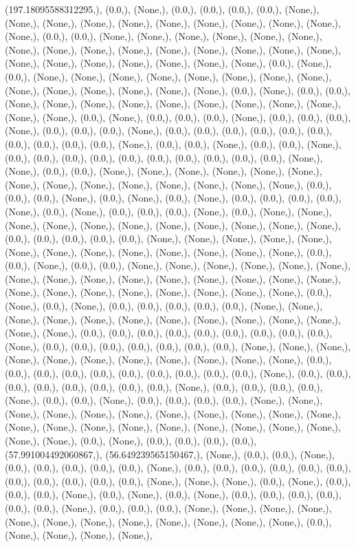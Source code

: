 \documentclass{article}
\begin{document}
(197.18095588312295,), (0.0,), (None,), (0.0,), (0.0,), (0.0,), (0.0,), (None,), (None,), (None,), (None,), (None,), (None,), (None,), (None,), (None,), (None,), (None,), (0.0,), (0.0,), (None,), (None,), (None,), (None,), (None,), (None,), (None,), (None,), (None,), (None,), (None,), (None,), (None,), (None,), (None,), (None,), (None,), (None,), (None,), (None,), (None,), (None,), (0.0,), (None,), (0.0,), (None,), (None,), (None,), (None,), (None,), (None,), (None,), (None,), (None,), (None,), (None,), (None,), (None,), (None,), (0.0,), (None,), (0.0,), (0.0,), (None,), (None,), (None,), (None,), (None,), (None,), (None,), (None,), (None,), (None,), (None,), (0.0,), (None,), (0.0,), (0.0,), (0.0,), (None,), (0.0,), (0.0,), (0.0,), (None,), (0.0,), (0.0,), (0.0,), (None,), (0.0,), (0.0,), (0.0,), (0.0,), (0.0,), (0.0,), (0.0,), (0.0,), (0.0,), (0.0,), (None,), (0.0,), (0.0,), (None,), (0.0,), (0.0,), (None,), (0.0,), (0.0,), (0.0,), (0.0,), (0.0,), (0.0,), (0.0,), (0.0,), (0.0,), (0.0,), (None,), (None,), (0.0,), (0.0,), (None,), (None,), (None,), (None,), (None,), (None,), (None,), (None,), (None,), (None,), (None,), (None,), (None,), (None,), (0.0,), (0.0,), (0.0,), (None,), (0.0,), (None,), (0.0,), (None,), (0.0,), (0.0,), (0.0,), (0.0,), (None,), (0.0,), (None,), (0.0,), (0.0,), (0.0,), (None,), (0.0,), (None,), (None,), (None,), (None,), (None,), (None,), (None,), (None,), (None,), (None,), (None,), (0.0,), (0.0,), (0.0,), (0.0,), (0.0,), (None,), (None,), (None,), (None,), (None,), (None,), (None,), (None,), (None,), (None,), (None,), (None,), (None,), (0.0,), (0.0,), (None,), (0.0,), (0.0,), (None,), (None,), (None,), (None,), (None,), (None,), (None,), (None,), (None,), (None,), (None,), (None,), (None,), (None,), (None,), (None,), (None,), (None,), (None,), (None,), (None,), (None,), (None,), (0.0,), (None,), (0.0,), (None,), (0.0,), (0.0,), (0.0,), (0.0,), (0.0,), (None,), (None,), (None,), (None,), (None,), (None,), (None,), (None,), (None,), (None,), (None,), (None,), (None,), (0.0,), (0.0,), (0.0,), (0.0,), (0.0,), (0.0,), (0.0,), (0.0,), (0.0,), (None,), (0.0,), (0.0,), (0.0,), (0.0,), (0.0,), (0.0,), (0.0,), (None,), (None,), (None,), (None,), (None,), (None,), (None,), (None,), (None,), (None,), (None,), (0.0,), (0.0,), (0.0,), (0.0,), (0.0,), (0.0,), (0.0,), (0.0,), (0.0,), (0.0,), (None,), (0.0,), (0.0,), (0.0,), (0.0,), (0.0,), (0.0,), (0.0,), (0.0,), (None,), (0.0,), (0.0,), (0.0,), (0.0,), (None,), (0.0,), (0.0,), (None,), (0.0,), (0.0,), (0.0,), (0.0,), (None,), (None,), (None,), (None,), (None,), (None,), (None,), (None,), (None,), (None,), (None,), (None,), (None,), (None,), (None,), (None,), (None,), (None,), (None,), (None,), (None,), (None,), (0.0,), (None,), (0.0,), (0.0,), (0.0,), (0.0,), (57.991004492060867,), (56.649239565150467,), (None,), (0.0,), (0.0,), (None,), (0.0,), (0.0,), (0.0,), (0.0,), (0.0,), (None,), (0.0,), (0.0,), (0.0,), (0.0,), (0.0,), (0.0,), (0.0,), (0.0,), (0.0,), (0.0,), (0.0,), (None,), (None,), (None,), (0.0,), (None,), (0.0,), (0.0,), (0.0,), (None,), (0.0,), (None,), (0.0,), (None,), (0.0,), (0.0,), (0.0,), (0.0,), (0.0,), (0.0,), (None,), (0.0,), (0.0,), (0.0,), (None,), (None,), (None,), (None,), (None,), (None,), (None,), (None,), (None,), (None,), (None,), (None,), (0.0,), (None,), (None,), (None,), (None,), 
\end{document}
